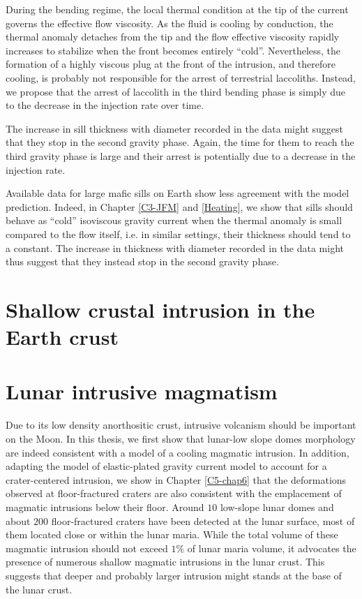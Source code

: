 During the bending  regime, the local thermal condition at  the tip of
the current  governs the  effective flow viscosity.   As the  fluid is
cooling by conduction,  the thermal anomaly detaches from  the tip and
the flow effective  viscosity rapidly increases to  stabilize when the
front  becomes entirely  ``cold''.  Nevertheless,  the formation  of a
highly  viscous plug  at the  front  of the  intrusion, and  therefore
cooling, is  probably not  responsible for  the arrest  of terrestrial
laccoliths. Instead,  we propose that  the arrest of laccolith  in the
third bending  phase is simply  due to  the decrease in  the injection
rate over time.

The  increase in  sill thickness  with diameter  recorded in  the data
might suggest that  they stop in the second gravity  phase. Again, the
time for  them to  reach the  third gravity phase  is large  and their
arrest is potentially due to a decrease in the injection rate.


Available data for large mafic sills on Earth show less agreement with
the   model  prediction.    Indeed,   in   Chapter  \ref{C3-JFM}   and
\ref{Heating}, we show that sills should behave as ``cold'' isoviscous
gravity current when the thermal anomaly is small compared to the flow
itself, i.e.   in similar settings,  their thickness should tend  to a
constant.  The  increase in  thickness with  diameter recorded  in the
data might thus  suggest that they instead stop in  the second gravity
phase.

\section{Shallow crustal intrusion in the Earth crust}
\label{sec:perspectives}




\section{Lunar intrusive magmatism}
\label{sec:floor-fract-crat}

Due to its low density  anorthositic crust, intrusive volcanism should
be important on the Moon. In this thesis, we first show that lunar-low
slope domes morphology are indeed consistent with a model of a cooling
magmatic intrusion.  In addition, adapting the model of elastic-plated
gravity current model  to account for a  crater-centered intrusion, we
show  in  Chapter \ref{C5-chap6}  that  the  deformations observed  at
floor-fractured craters  are also  consistent with the  emplacement of
magmatic  intrusions below  their floor.  Around $10$  low-slope lunar
domes and  about $200$ floor-fractured  craters have been  detected at
the lunar  surface, most  of them  located close  or within  the lunar
maria. While the  total volume of these magmatic  intrusion should not
exceed  $1\%$ of  lunar maria  volume,  it advocates  the presence  of
numerous shallow magmatic intrusions in the lunar crust. This suggests
that deeper and probably larger intrusion  might stands at the base of
the lunar crust.

